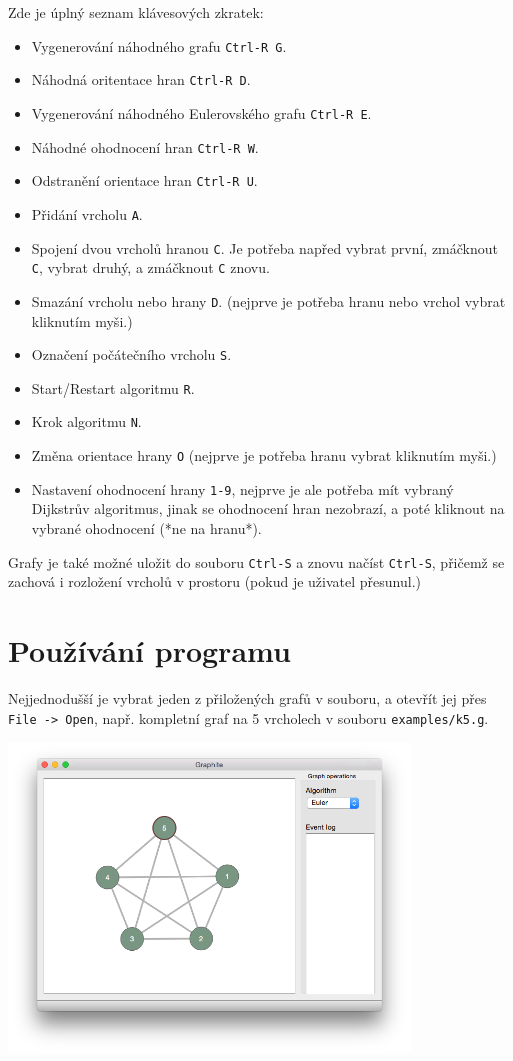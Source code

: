 \documentclass{article}
\def\code#1{\texttt{#1}}
\begin{document}
Zde je úplný seznam klávesových zkratek:

\begin{itemize}
  \item Vygenerování náhodného grafu \code{Ctrl-R G}.
  \item Náhodná oritentace hran \code{Ctrl-R D}.
  \item Vygenerování náhodného Eulerovského grafu \code{Ctrl-R E}.
  \item Náhodné ohodnocení hran \code{Ctrl-R W}.
  \item Odstranění orientace hran \code{Ctrl-R U}.
  \item Přidání vrcholu \code{A}.
  \item Spojení dvou vrcholů hranou \code{C}. Je potřeba napřed vybrat první, zmáčknout \code{C}, vybrat druhý, a zmáčknout \code{C} znovu.
  \item Smazání vrcholu nebo hrany \code{D}. (nejprve je potřeba hranu nebo vrchol vybrat kliknutím myši.)
  \item Označení počátečního vrcholu \code{S}.
  \item Start/Restart algoritmu \code{R}.
  \item Krok algoritmu \code{N}.
  \item Změna orientace hrany \code{O} (nejprve je potřeba hranu vybrat kliknutím myši.)
  \item Nastavení ohodnocení hrany \code{1-9}, nejprve je ale potřeba mít vybraný Dijkstrův algoritmus, jinak se ohodnocení hran nezobrazí, a poté kliknout na vybrané ohodnocení (*ne na hranu*).
\end{itemize}

Grafy je také možné uložit do souboru \code{Ctrl-S} a znovu načíst \code{Ctrl-S},
přičemž se zachová i rozložení vrcholů v prostoru (pokud je uživatel
přesunul.)

\pagebreak

\section{Používání programu}

Nejjednodušší je vybrat jeden z přiložených grafů v souboru, a otevřít
jej přes \code{File -> Open}, např. kompletní graf na 5 vrcholech v souboru
\code{examples/k5.g}.

\begin{center}
	\includegraphics[width=0.8\textwidth]{iYrD1VK.png}	
\end{center}
\end{document}
